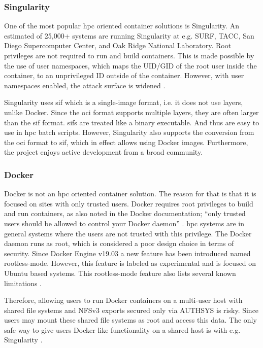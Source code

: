 \documentclass[12pt]{article}
\begin{document}
\subsubsection{Singularity}
One of the most popular \gls{hpc} oriented container solutions is Singularity. An estimated of 25,000+ systems are running Singularity at e.g. SURF, TACC, San Diego Supercomputer Center, and Oak Ridge National Laboratory. Root privileges are not required to run and build containers. This is made possible by the use of user namespaces, which maps the UID/GID of the root user inside the container, to an unprivileged ID outside of the container. However, with user namespaces enabled, the attack surface is widened \cite{rhel-cve}.

Singularity uses \gls{sif} which is a single-image format, i.e. it does not use layers, unlike Docker. Since the \gls{oci} format supports multiple layers, they are often larger than the \gls{sif} format. \glspl{sif} are treated like a binary executable. And thus are easy to use in \gls{hpc} batch scripts. However, Singularity also supports the conversion from the \gls{oci} format to \gls{sif}, which in effect allows using Docker images. Furthermore, the project enjoys active development from a broad community.


\subsubsection{Docker}
Docker is not an \gls{hpc} oriented container solution. The reason for that is that it is focused on sites with only trusted users. Docker requires root privileges to build and run containers, as also noted in the Docker documentation; ``only trusted users should be allowed to control your Docker daemon'' \cite{docker-security}. \gls{hpc} systems are in general systems where the users are not trusted with this privilege. The Docker daemon runs as root, which is considered a poor design choice in terms of security. Since Docker Engine v19.03 a new feature has been introduced named rootless-mode. However, this feature is labeled as experimental and is focused on Ubuntu based systems. This rootless-mode feature also lists several known limitations \cite{docker-rootless}.

Therefore, allowing users to run Docker containers on a multi-user host with shared file systems and NFSv3 exports secured only via AUTHSYS is risky. Since users may mount these shared file systems as root and access this data. The only safe way to give users Docker like functionality on a shared host is with e.g. Singularity \cite{cloudy-hutch}.
\end{document}
